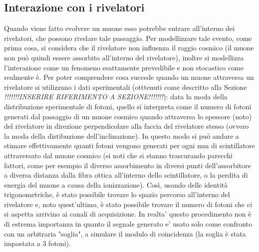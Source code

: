 \subsection{Interazione con i rivelatori}
Quando viene fatto evolvere un muone esso potrebbe entrare all'interno dei rivelatori, che possono rivelare tale passaggio. Per modellizzare tale evento, come prima cosa,
si considera che il rivelatore non influenza il raggio cosmico (il muone non può quindi essere assorbito all'interno del rivelatore), inoltre
si modellizza l'interazione come un fenomeno esattamente prevedibile e non stocastico come realmente è. Per poter comprendere cosa succede quando un muone attraversa
un rivelatore si utilizzano i dati sperimentali (otttenuti come descritto alla Sezione \textit{!!!!!!!INSERIRE RIFERIMENTO A SEZIONE!!!!!!!}): data la moda della distribuzione
sperimentale di fotoni, quello si interpreta come il numero di fotoni generati dal passaggio di un muone cosmico quando attraversa lo spessore (noto) del rivelatore
in direzione perpendicolare alla faccia del rivelatore stesso (ovvero la moda della distibuzione dell'inclinazione). In questo modo si può andare a stimare effettivamente quanti fotoni vengono generati per ogni mm di scintillatore attraversato dal muone cosmico (si noti che si stanno trascurando parecchi fattori, come per esempio il diverso assorbimento in diversi punti dell'assorbitore
a diversa distanza dalla fibra ottica all'interno dello scintillatore, o la perdita di energia del muone a causa della ionizzazione). Così, usando delle identità trigonometriche, è stato possibile trovare lo spazio percorso all'interno del rivelatore e, noto quest'ultimo, è stato possibile trovare il numero di fotoni che ci si aspetta arrivino ai canali di acquisizione. In realta' questo procedimento non \`e di estrema importanza in quanto il segnale generato e' usato solo come confronto con un arbitraria "soglia", a simulare il modulo di coincidenza (la soglia \`e stata impostata a 3 fotoni).


